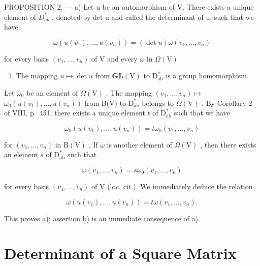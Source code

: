 PROPOSITION 2. --- a) Let u be an automorphism of V. There exists a unique element of \(D_{ab}^{*}\) , denoted by det u and called the determinant of u, such that we have

\[
\omega (u (v _ {1}), \ldots , u (v _ {n})) = (\det u) \omega (v _ {1}, \ldots , v _ {n})\tag{15}
\]

for every basis \((v_{1},\ldots ,v_{n})\) of V and every \(\omega\) in \(\Omega (\mathrm{V})\)

\begin{enumerate}
\def\labelenumi{\alph{enumi})}
\setcounter{enumi}{1}
\tightlist
\item
  The mapping \(u \mapsto \det u\) from \(\mathbf{GL}(\mathrm{V})\) to \(\mathrm{D}_{\mathrm{ab}}^{*}\) is a group homomorphism.
\end{enumerate}

Let \(\omega_0\) be an element of \(\Omega (\mathrm{V})\) . The mapping \((v_{1},\ldots ,v_{n})\mapsto\) \(\omega_0(u(v_1),\dots ,u(v_n))\) from B(V) to \(\mathrm{D}_{\mathrm{ab}}^{*}\) belongs to \(\Omega (\mathrm{V})\) . By Corollary 2 of VIII, p.~451, there exists a unique element \(t\) of \(\mathrm{D}_{\mathrm{ab}}^{*}\) such that we have

\[
\omega_ {0} (u (v _ {1}), \ldots , u (v _ {n})) = t \omega_ {0} (v _ {1}, \ldots , v _ {n})
\]

for \((v_{1},\ldots ,v_{n})\) in \(\mathrm{B(V)}\) . If \(\omega\) is another element of \(\Omega (\mathrm{V})\) , then there exists an element \(s\) of \(\mathrm{D}_{\mathrm{ab}}^{*}\) such that

\[
\omega (v _ {1}, \ldots , v _ {n}) = s \omega_ {0} (v _ {1}, \ldots , v _ {n})
\]

for every basis \((v_{1},\ldots ,v_{n})\) of V (loc. cit.). We immediately deduce the relation

\[
\omega (u (v _ {1}), \dots , u (v _ {n})) = t \omega (v _ {1}, \dots , v _ {n}).
\]

This proves a); assertion b) is an immediate consequence of a).

\section{Determinant of a Square Matrix}

